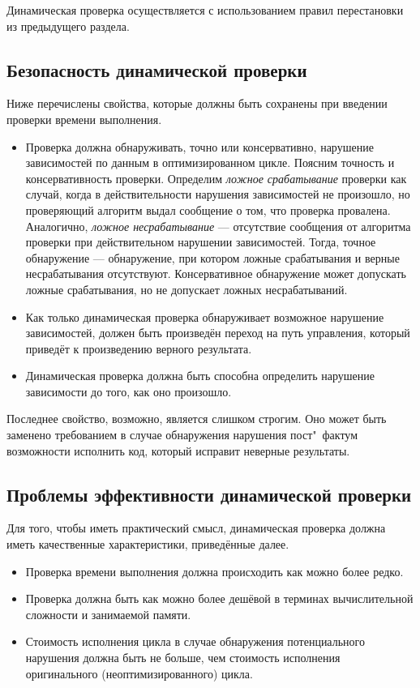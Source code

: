 Динамическая проверка осуществляется с использованием правил перестановки из предыдущего раздела.

\subsection{Безопасность динамической проверки}

Ниже перечислены свойства, которые должны быть сохранены при введении проверки времени выполнения.

\begin{itemize}
	\item Проверка должна обнаруживать, точно или консервативно, нарушение зависимостей по данным в оптимизированном цикле. Поясним точность и консервативность проверки. Определим \emph{ложное  срабатывание} проверки как случай, когда в действительности нарушения зависимостей не произошло, но проверяющий алгоритм выдал сообщение о том, что проверка провалена. Аналогично, \emph{ложное  несрабатывание} --- отсутствие сообщения от алгоритма проверки при действительном нарушении зависимостей. Тогда, точное обнаружение --- обнаружение, при котором  ложные срабатывания и верные несрабатывания отсутствуют. Консервативное обнаружение может допускать ложные  срабатывания, но не допускает ложных несрабатываний.
	\item Как только динамическая проверка обнаруживает возможное нарушение зависимостей, должен быть произведён переход на путь управления, который приведёт к произведению верного результата.
	\item Динамическая проверка должна быть способна определить нарушение зависимости до того, как оно произошло.
\end{itemize}

Последнее свойство, возможно, является слишком строгим. Оно может быть заменено требованием в случае обнаружения нарушения пост"~фактум возможности исполнить код, который исправит неверные результаты.

\subsection{Проблемы эффективности динамической проверки}

Для того, чтобы иметь практический смысл, динамическая проверка должна иметь качественные характеристики, приведённые далее.

\begin{itemize}
	\item Проверка времени выполнения должна происходить как можно более редко.
	\item Проверка должна быть как можно более дешёвой в терминах вычислительной сложности и занимаемой памяти.
	\item Стоимость исполнения цикла в случае обнаружения потенциального нарушения должна быть не больше, чем стоимость исполнения оригинального (неоптимизированного) цикла.
\end{itemize}

